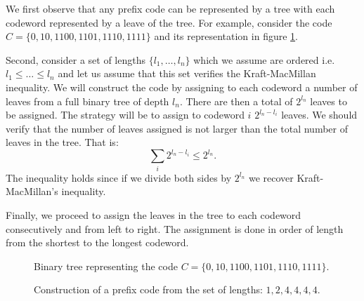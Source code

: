 We first observe that any prefix code can be represented by a tree with each codeword represented by a leave of the tree. For example, consider the code $C=\{0,10,1100,1101,1110,1111\}$ and its representation in figure \ref{fig:tree}.

Second, consider a set of lengths $\{l_1,\ldots,l_n\}$ which we assume are ordered i.e. $l_1\leq\ldots\leq l_n$ and let us assume that this set verifies the Kraft-MacMillan inequality. We will construct the code by assigning to each codeword a number of leaves from a full binary tree of depth $l_n$. There are then a total of $2^{l_n}$ leaves to be assigned. The strategy will be to assign to codeword $i$ $2^{l_n-l_i}$ leaves. 
We should verify that the number of leaves assigned is not larger than the total number of leaves in the tree. That is: 
\begin{equation}
\sum_i 2^{l_n-l_i}\leq 2^{l_n}.
\end{equation}
The inequality holds since if we divide both sides by $2^{l_n}$ we recover Kraft-MacMillan's inequality.

Finally, we proceed to assign the leaves in the tree to each codeword consecutively and from left to right. The assignment is done in order of length from the shortest to the longest codeword. %
\begin{figure}

\caption{Binary tree representing the code $C=\{0,10,1100,1101,1110,1111\}$.}\label{fig:tree}
\end{figure}
\begin{figure}

\caption{Construction of a prefix code from the set of lengths: $1,2,4,4,4,4$.}
\end{figure}


